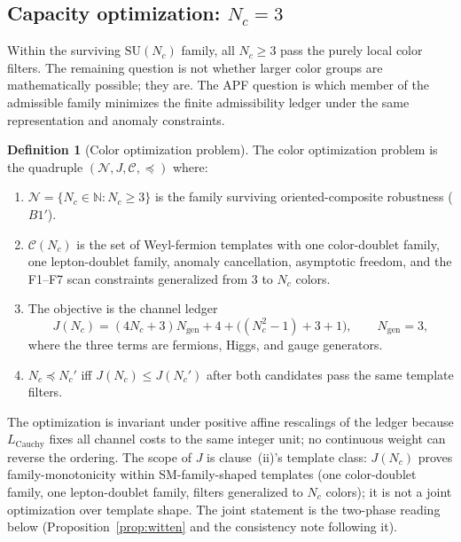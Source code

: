 \documentclass[11pt]{article}
\theoremstyle{definition}
\newtheorem{definition}[theorem]{Definition}
\newcommand{\SU}{\mathrm{SU}}
\begin{document}
\subsection{Capacity optimization: $N_c = 3$}
\label{sec:Nc_optimization}

Within the surviving $\SU(N_c)$ family, all $N_c\ge3$ pass the purely
local color filters.  The remaining question is not whether larger color
groups are mathematically possible; they are.  The APF question is which
member of the admissible family minimizes the finite admissibility ledger
under the same representation and anomaly constraints.

\begin{definition}[Color optimization problem]
\label{def:color_optimization}
The color optimization problem is the quadruple
$(\mathcal{N},J,\mathcal C,\preceq)$ where:
\begin{enumerate}[nosep,label=(\roman*),leftmargin=1.8em]
  \item $\mathcal{N}=\{N_c\in\mathbb N: N_c\ge3\}$ is the family surviving
  oriented-composite robustness ($B1'$).
  \item $\mathcal C(N_c)$ is the set of Weyl-fermion templates with one
  color-doublet family, one lepton-doublet family, anomaly cancellation,
  asymptotic freedom, and the F1--F7 scan constraints generalized from
  $3$ to $N_c$ colors.
  \item The objective is the channel ledger
  \[
    J(N_c)=(4N_c+3)N_{\mathrm{gen}}+4+\bigl((N_c^2-1)+3+1\bigr),
    \qquad N_{\mathrm{gen}}=3,
  \]
  where the three terms are fermions, Higgs, and gauge generators.
  \item $N_c\preceq N_c'$ iff $J(N_c)\le J(N_c')$ after both candidates
  pass the same template filters.
\end{enumerate}
The optimization is invariant under positive affine rescalings of the
ledger because $L_{\mathrm{Cauchy}}$ fixes all channel costs to the same
integer unit; no continuous weight can reverse the ordering.
The scope of $J$ is clause~(ii)'s template class: $J(N_c)$ proves
family-monotonicity within SM-family-shaped templates (one
color-doublet family, one lepton-doublet family, filters generalized
to $N_c$ colors); it is not a joint optimization over template shape.
The joint statement is the two-phase reading below
(Proposition~\ref{prop:witten} and the consistency note following it).
\end{definition}
\end{document}
